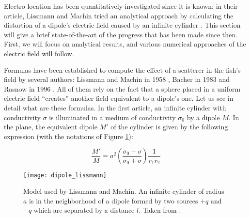 \label{sub:modelisation_champ_bio}

Electro-location has been quantitatively investigated since it is
known: in their article, Lissmann and Machin tried an analytical
approach by calculating the distortion of a dipole's electric
field caused by an infinite cylinder \cite{lissmann1958mechanism}.
This section will give a brief state-of-the-art of the progress
that has been made since then. First, we will focus on analytical
results, and various numerical approaches of the electric field
will follow.

Formulas have been established to compute the effect of a scatterer
in the fish's field by several authors: Lissmann and Machin in 1958
\cite{lissmann1958mechanism}, Bacher in 1983 \cite{bacher1983} and
Rasnow in 1996 \cite{rasnow1996simple}. All of them rely on the fact
that a sphere placed in a uniform electric field {}``creates'' another
field equivalent to a dipole's one. Let us see in detail what are
these formulas. In the first article, an infinite cylinder with conductivity
$\sigma$ is illuminated in a medium of conductivity $\sigma_{0}$
by a dipole $M$. In the plane, the equivalent dipole $M'$ of the
cylinder is given by the following expression (with the notations
of Figure \ref{fig:modele_lissmann}):

\begin{equation}
\frac{M'}{M}=a^{2}\left(\frac{\sigma_{0}-\sigma}{\sigma_{0}+\sigma}\right)\frac{1}{r_{1}r_{2}}\label{eq:dipole_lissmann}\end{equation}


%
\begin{figure}
\centering\texttt{[image: dipole\_lissmann]}

\caption{Model used by Lissmann and Machin. An infinite cylinder of radius
$a$ is in the neighborhood of a dipole formed by two sources $+q$
and $-q$ which are separated by a distance $l$. Taken from \cite{lissmann1958mechanism}.
\label{fig:modele_lissmann}}

\end{figure}


